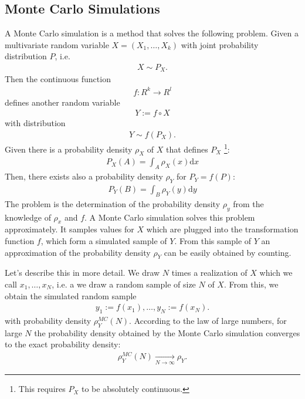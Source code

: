 \documentclass[a4paper,10pt,twoside,pagesize,abstracton]{scrartcl}
\renewcommand{\d}{\mathrm{d}\!} %
\theoremstyle{plain}%
\theoremstyle{definition}
\theoremstyle{remark}
\begin{document}
\subsection{Monte Carlo Simulations}
A Monte Carlo simulation is a method that solves the following problem. Given a multivariate random variable $X = (X_1,\ldots,X_k)$ with joint probability distribution $P$, i.e.
\begin{align}
 X \sim P_X.
\end{align}
Then the continuous function 
\begin{align}
 f:R^k \rightarrow R^l
\end{align}
defines another random variable
\begin{align}
 Y := f \circ X
\end{align}
with distribution 
\begin{align}
 Y \sim f(P_X).
\end{align}
Given there is a probability density $\rho_X$ of $X$ that defines $P_X$%
\footnote{%
  This requires $P_X$ to be absolutely continuous.
}:
\begin{align}
 P_X(A) = \int_A \rho_X(x) \d x
\end{align}
Then, there exists also a probability density $\rho_Y$ for $P_Y=f(P)$:
\begin{align}
 P_Y(B) = \int_B \rho_Y(y) \d y 
\end{align}
The problem is the determination of the probability density $\rho_y$ from the knowledge of $\rho_x$ and $f$. A Monte Carlo simulation solves this problem approximately. It samples values for $X$ which are plugged into the transformation function $f$, which form a simulated sample of $Y$. From this sample of $Y$  an approximation of the probability density $\rho_Y$ can be easily obtained by counting.\par
Let's describe this in more detail. We draw $N$ times a realization of $X$ which we call $x_1, \ldots, x_N$, i.e. a we draw a random sample of size $N$ of $X$. From this, we obtain the simulated random sample 
\begin{align}
 y_1 := f(x_1), \ldots, y_N := f(x_N).
\end{align}
with probability density $\rho_Y^{MC}(N)$. According to the law of large numbers, for large $N$ the probability density obtained by the Monte Carlo simulation converges to the exact probability density:
\begin{align}
 \rho_Y^{MC}(N) \xrightarrow[N \rightarrow \infty]{ } \rho_Y.
\end{align}
\end{document}
